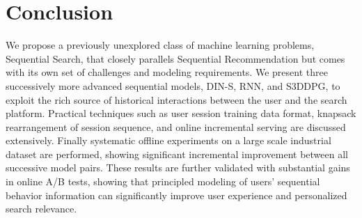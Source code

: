 \section{Conclusion}
\label{sec:conclusion}

We propose a previously unexplored class of machine learning problems, Sequential Search, that closely parallels Sequential Recommendation but comes with its own set of challenges and modeling requirements. We present three successively more advanced sequential models, DIN-S, RNN, and S3DDPG, to exploit the rich source of historical interactions between the user and the search platform. Practical techniques such as user session training data format, knapsack rearrangement of session sequence, and online incremental serving are discussed extensively. Finally systematic offline experiments on a large scale industrial dataset are performed, showing significant incremental improvement between all successive model pairs. These results are further validated with substantial gains in online A/B tests, showing that principled modeling of users' sequential behavior information can significantly improve user experience and personalized search relevance.


